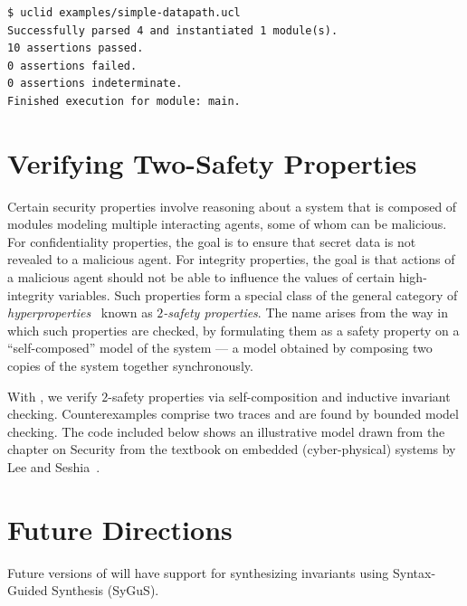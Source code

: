 \begin{Verbatim}[frame=single, samepage=true]
$ uclid examples/simple-datapath.ucl
Successfully parsed 4 and instantiated 1 module(s).
10 assertions passed.
0 assertions failed.
0 assertions indeterminate.
Finished execution for module: main.
\end{Verbatim}

\section{Verifying Two-Safety Properties}

Certain security properties involve reasoning about a system
that is composed of modules modeling
multiple interacting agents, some of whom can be malicious. 
For confidentiality
properties, the goal is to ensure that secret data is not revealed to a malicious
agent. For integrity properties, the goal is that actions of a malicious agent
should not be able to influence the values of certain high-integrity variables.
Such properties form a special class of the general category of {\em hyperproperties}~\cite{clarkson-jcs10}
known as {\em $2$-safety properties}. The name arises from the way in which
such properties are checked, by formulating them as a safety property on a
``self-composed'' model of the system --- a model obtained by composing two
copies of the system together synchronously.

With \uclid{}, we verify $2$-safety properties via self-composition and
inductive invariant checking. Counterexamples comprise two traces
and are found by bounded model checking.
The code included below shows an
illustrative \uclid{} model drawn from the chapter on Security from the textbook
on embedded (cyber-physical) systems by Lee and Seshia~\cite{leeseshia-16}.

    

\section{Future Directions}

Future versions of \uclid{} will have support for synthesizing invariants using Syntax-Guided Synthesis (SyGuS).

